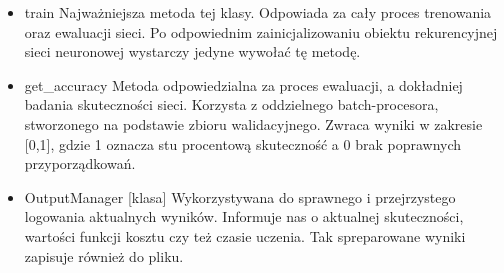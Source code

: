 \begin{itemize}

  \item{train}
  \newline Najważniejsza metoda tej klasy. Odpowiada za cały proces trenowania oraz ewaluacji sieci. Po 
  odpowiednim zainicjalizowaniu obiektu rekurencyjnej sieci neuronowej wystarczy jedyne wywołać tę metodę.
  \item{get\_accuracy}
  \newline Metoda odpowiedzialna za proces ewaluacji, a dokładniej badania skuteczności sieci. Korzysta z 
  oddzielnego batch-procesora, stworzonego na podstawie zbioru walidacyjnego. Zwraca wyniki w zakresie
  [0,1], gdzie 1 oznacza stu procentową skuteczność a 0 brak poprawnych przyporządkowań.
  \item{OutputManager [klasa]}
  \newline Wykorzystywana do sprawnego i przejrzystego logowania aktualnych wyników. Informuje nas o aktualnej
  skuteczności, wartości funkcji kosztu czy też czasie uczenia. Tak spreparowane wyniki zapisuje również do pliku.

\end{itemize}